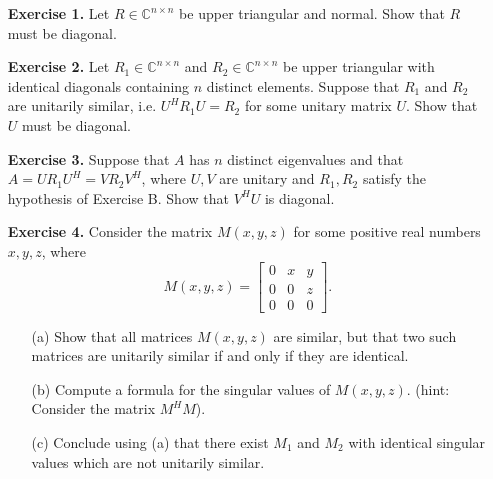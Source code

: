 \documentclass[14pt]{report}
\begin{document}
\begin{enumerate}
  \item[\textbf{Exercise 1.}] Let $R\in\mathbb{C}^{n\times n}$ be upper 
    triangular and normal. Show that $R$ must be diagonal. 

  \item[\textbf{Exercise 2.}] Let $R_1\in\mathbb{C}^{n\times n}$ and
    $R_2\in\mathbb{C}^{n\times n}$ be upper triangular with identical diagonals
    containing $n$ distinct elements. Suppose that $R_1$ and $R_2$ are 
    unitarily similar, i.e. $U^HR_1U = R_2$ for some unitary matrix $U$.
    Show that $U$ must be diagonal.

  \item[\textbf{Exercise 3.}] Suppose that $A$ has $n$ distinct eigenvalues and
    that $A = U R_1 U^H = V R_2 V^H$, where $U,V$ are unitary and 
    $R_1, R_2$ satisfy the hypothesis of Exercise B. Show that $V^H U$ is
    diagonal.


  \item[\textbf{Exercise 4.}] Consider the matrix $M(x,y,z)$ for some positive
    real numbers $x,y,z$, where
  \[M(x,y,z)=\left[\begin{array}{ccc}0&x&y\\0&0&z\\0&0&0\end{array}\right].\]
    \begin{enumerate}
      \item[(a)] Show that all matrices $M(x,y,z)$ are similar, but that two
         such matrices are unitarily similar if and only if they are identical.
      \item[(b)] Compute a formula for the singular values of $M(x,y,z)$. 
        (hint: Consider the matrix $M^H M$).
      \item[(c)] Conclude using (a) that there exist $M_1$ and $M_2$ with
        identical singular values which are not unitarily similar.
      \end{enumerate}
  

\end{enumerate}
\end{document}
